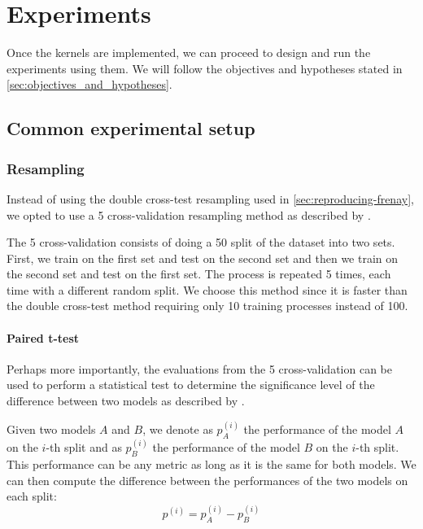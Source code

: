\chapter{Experiments}
\label{sec:experiments}

Once the kernels are implemented, we can proceed to design and run the
experiments using them. We will follow the objectives and hypotheses stated in
\cref{sec:objectives_and_hypotheses}.

\section{Common experimental setup}

\subsection{Resampling}
\label{sec:resampling}

Instead of using the double cross-test resampling used in
\cref{sec:reproducing-frenay}, we opted to use a 5 cross-validation
resampling method as described by
\textcite{dietterichApproximateStatisticalTests1998}.

The 5 cross-validation consists of doing a 50 split of
the dataset into two sets. First, we train on the first set and test on the
second set and then we train on the second set and test on the first set. The
process is repeated 5 times, each time with a different random split. We choose
this method since it is faster than the double cross-test method requiring only
10 training processes instead of 100.


\subsubsection{Paired t-test}%
\label{sec:paired-t-test}

Perhaps more importantly, the evaluations from the 5 cross-validation
can be used to perform a statistical test to determine the significance level
of the difference between two models as described by \textcite{dietterichApproximateStatisticalTests1998}.

Given two models $A$ and $B$, we denote as $p_A^{(i)}$ the performance of the
model $A$ on the $i$-th split and as $p_B^{(i)}$ the performance of the model
$B$ on the $i$-th split. This performance can be any metric as long as it is
the same for both models.
We can then compute the difference between the
performances of the two models on each split:
\begin{equation}
    p^{(i)} = p_A^{(i)} - p_B^{(i)}
\end{equation}

